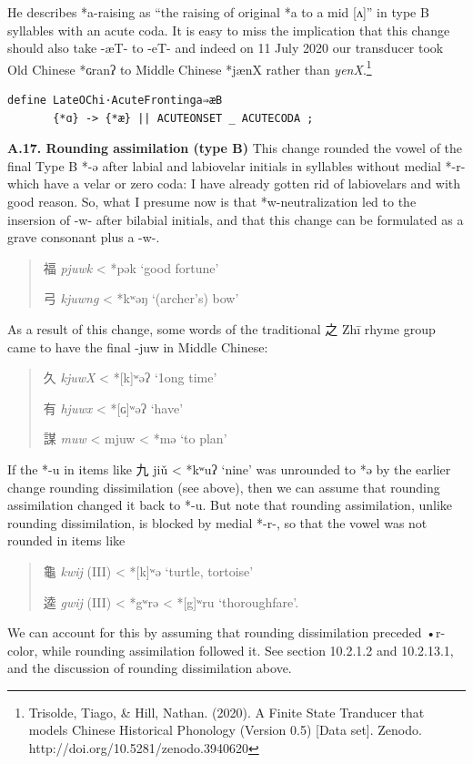 \documentclass[xetex, svgnames, 12pt]{scrartcl}
\newcounter{para}
\newcommand\mypara[1]{\par\refstepcounter{para}\textbf{\thepara\space#1\space}}
\begin{document}
He describes *a-raising as ``the raising of original *a to a mid [ʌ]'' in type B syllables with an acute coda. It is easy to miss the implication that this change should also take -æT- to -eT- and indeed on 11 July 2020 our transducer took Old Chinese *ɢranʔ to Middle Chinese *jænX rather than \textit{yenX}.\footnote{Trisolde, Tiago, \& Hill, Nathan. (2020). A Finite State Tranducer that models Chinese Historical Phonology (Version 0.5) [Data set]. Zenodo. http://doi.org/10.5281/zenodo.3940620}

\begin{verbatim}
define LateOChi·AcuteFrontinga⇒æB 
       {*ɑ} -> {*æ} || ACUTEONSET _ ACUTECODA ;
\end{verbatim} 

\mypara{A.17. Rounding assimilation (type B)}
 This change rounded the vowel of the final Type B *-ə after labial and labiovelar initials in
 syllables without medial *-r- which have a velar or zero coda:
 I have already gotten rid of labiovelars and with good reason. So, what I presume now is that 
 *w-neutralization led to the insersion of -w- after bilabial initials, 
 and that this change can be formulated as a grave consonant
 plus a -w-. 
 \begin{quote}
 福 %
\textit{pjuwk} < *pək `good fortune'

 弓 %
 \textit{kjuwng} < *kʷəŋ `(archer's) bow'
 \end{quote}
 As a result of this change, some words of the traditional 之 Zhī rhyme group came to have
 the final -juw in Middle Chinese:
 \begin{quote}
 久 %
 \textit{kjuwX} < *[k]ʷəʔ `1ong time'
 
 有 %
 \textit{hjuwx} < *[ɢ]ʷəʔ `have'
 
 謀 %
 \textit{muw} < mjuw < *mə `to plan'
 \end{quote}
 If the *-u in items like 九 jiǔ < *kʷuʔ `nine' was unrounded to *ə by the earlier change
 rounding dissimilation (see above), then we can assume that rounding assimilation
 changed it back to *-u. But note that rounding assimilation, unlike rounding dissimilation,
 is blocked by medial *-r-, so that the vowel was not rounded in items like
 \begin{quote}
 龜 %
 \textit{kwij} (III) < *[k]ʷə `turtle, tortoise'

 逵 %
 \textit{gwij} (III) < *gʷrə < *[g]ʷru `thoroughfare'.
  \end{quote}
 We can account for this by assuming that rounding dissimilation preceded •r-color, while
 rounding assimilation followed it. See section 10.2.1.2 and 10.2.13.1, and the discussion
 of rounding dissimilation above.
\end{document}
